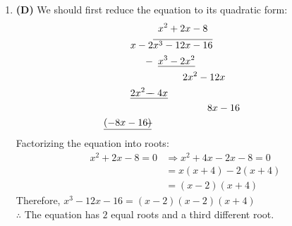 \begin{multicols}{2}
\begin{enumerate}[label={\textbf{\arabic*.}}]
    \item \textbf{(D)} We should first reduce the equation to its quadratic form:
        \begin{align*}
            & \hspace{5pt} x^2 + 2x - 8 \\
            x - 2 & \overline{x^3 - 12x - 16} \\ 
            - & \hspace{5pt} \underline{x^3 - 2x^2} \\
            & \hspace{30pt} 2x^2 - 12x \\
            - & \hspace{-23pt} \underline{2x^2 - 4x} \\
            & \hspace{55pt} 8x - 16 \\
            - & \hspace{-50pt} \underline{(-8x - 16)}
        \end{align*}
        Factorizing the equation into roots:
        \begin{align*} 
            x^2 + 2x - 8 = 0 &\Rightarrow x^2 + 4x - 2x - 8 = 0 \\
            &= x(x + 4) - 2(x + 4) \\
            &= (x - 2)(x + 4)
        \end{align*}
        Therefore, \(x^3 - 12x - 16 = (x - 2)(x - 2)(x + 4) \) \\
        \(\therefore\) The equation has \(2\) equal roots and a third different root. 
            

\end{enumerate}
\end{multicols}

